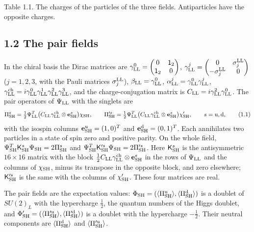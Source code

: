 \documentclass[
  10pt,
]{article}
\begin{document}
Table 1.1. The charges of the particles of the three fields.
Antiparticles have the opposite charges.

\hypertarget{the-pair-fields}{%
\subsection{1.2 The pair fields}\label{the-pair-fields}}

In the chiral basis the Dirac matrices are
\(\gamma^0_{\rm LL}=\begin{pmatrix}0&\mathsf 1_2\\\mathsf 1_2&0\end{pmatrix}\),
\(\gamma^j_{\rm LL}=\begin{pmatrix}0&\sigma^{\rm LL}_j\\-\sigma^{\rm LL}_j&0\end{pmatrix}\)
(\(j=1,2,3\), with the Pauli matrices \(\sigma^{\rm LL}_j\)),
\(\beta_{\rm LL}=\gamma^0_{\rm LL}\),
\(\alpha^j_{\rm LL}=\gamma^0_{\rm LL}\gamma^j_{\rm LL}\),
\(\gamma^{\rm ch}_{\rm LL}=i\gamma^0_{\rm LL}\gamma^1_{\rm LL}\gamma^2_{\rm LL}\gamma^3_{\rm LL}\),
and the charge-conjugation matrix is
\(C_{\rm LL}=i\gamma^2_{\rm LL}\gamma^0_{\rm LL}\). The pair operators
of \(\Psi_{\rm LL}\) with the singlets are
\[\Pi^s_{\rm SH}=\tfrac12\Psi^T_{\rm LL}\big(C_{\rm LL}\gamma^{\rm ch}_{\rm LL}\otimes\mathbf e^s_{\rm SH}\big)\chi_{\rm SH},\qquad
\Pi'^s_{\rm SH}=\tfrac12\Psi^T_{\rm LL}\big(C_{\rm LL}\gamma^{\rm ch}_{\rm LL}\otimes\mathbf e^s_{\rm SH}\big)\chi'_{\rm SH},\qquad s={\rm u},{\rm d},\tag{1.1}\]
with the isospin columns \(\mathbf e^{\rm u}_{\rm SH}=(1,0)^T\) and
\(\mathbf e^{\rm d}_{\rm SH}=(0,1)^T\). Each annihilates two particles
in a state of spin zero and positive parity. On the whole field,
\(\Psi^T_{\rm SH}\mathsf K^s_{\rm SH}\Psi_{\rm SH}=2\Pi^s_{\rm SH}\) and
\(\Psi^T_{\rm SH}\mathsf K'^s_{\rm SH}\Psi_{\rm SH}=2\Pi'^s_{\rm SH}\).
Here \(\mathsf K^s_{\rm SH}\) is the antisymmetric \(16\times16\) matrix
with the block
\(\tfrac12C_{\rm LL}\gamma^{\rm ch}_{\rm LL}\otimes\mathbf e^s_{\rm SH}\)
in the rows of \(\Psi_{\rm LL}\) and the columns of \(\chi_{\rm SH}\),
minus its transpose in the opposite block, and zero elsewhere;
\(\mathsf K'^s_{\rm SH}\) is the same with the columns of
\(\chi'_{\rm SH}\). These four matrices are real.

The pair fields are the expectation values:
\(\Phi_{\rm SH}=(\langle\Pi^{\rm u}_{\rm SH}\rangle,\langle\Pi^{\rm d}_{\rm SH}\rangle)\)
is a doublet of \(SU(2)_L\) with the hypercharge \(\tfrac12\), the
quantum numbers of the Higgs doublet, and
\(\Phi'_{\rm SH}=(\langle\Pi'^{\rm u}_{\rm SH}\rangle,\langle\Pi'^{\rm d}_{\rm SH}\rangle)\)
is a doublet with the hypercharge \(-\tfrac12\). Their neutral
components are \(\langle\Pi^{\rm d}_{\rm SH}\rangle\) and
\(\langle\Pi'^{\rm u}_{\rm SH}\rangle\).
\end{document}
